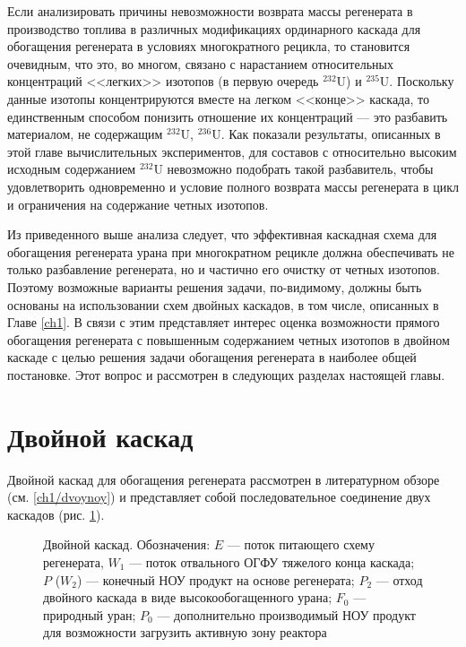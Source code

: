 Если анализировать причины невозможности возврата массы регенерата в производство топлива в различных модификациях ординарного каскада для обогащения регенерата в условиях многократного рецикла, то становится очевидным, что это, во многом, связано с нарастанием относительных концентраций <<легких>> изотопов (в первую очередь $^{232}$U) и $^{235}$U. Поскольку данные изотопы концентрируются вместе на легком <<конце>> каскада, то единственным способом понизить отношение их концентраций --- это разбавить материалом, не содержащим $^{232}$U, $^{236}$U. Как показали результаты, описанных в этой главе вычислительных экспериментов, для составов с относительно высоким исходным содержанием $^{232}$U невозможно подобрать такой разбавитель, чтобы удовлетворить одновременно и условие полного возврата массы регенерата в цикл и ограничения на содержание четных изотопов.

Из приведенного выше анализа следует, что эффективная каскадная схема для обогащения регенерата урана при многократном рецикле должна обеспечивать не только разбавление регенерата, но и частично его очистку от четных изотопов. Поэтому возможные варианты решения задачи, по-видимому, должны быть основаны на использовании схем двойных каскадов, в том числе, описанных в Главе \ref{ch1}. В связи с этим представляет интерес оценка возможности прямого обогащения регенерата с повышенным содержанием четных изотопов в двойном каскаде с целью решения задачи обогащения регенерата в наиболее общей постановке. Этот вопрос и рассмотрен в следующих разделах настоящей главы.

\section{Двойной каскад}\label{sec:ch2/dvoynoy}

Двойной каскад для обогащения регенерата рассмотрен в литературном обзоре (см. \ref{ch1/dvoynoy}) и представляет собой последовательное соединение двух каскадов (рис. \ref{fig:double_ru_in3}). 

\begin{figure}[ht]
  \caption{Двойной каскад. Обозначения: $E$ --- поток питающего схему регенерата, $W_1$ --- поток отвального ОГФУ тяжелого конца каскада; $P$ ($W_2$) --- конечный НОУ продукт на основе регенерата; $P_2$ --- отход двойного каскада в виде высокообогащенного урана; $F_0$ --- природный уран; $P_0$ --- дополнительно производимый НОУ продукт для возможности загрузить активную зону реактора}\label{fig:double_ru_in3}
\end{figure}

